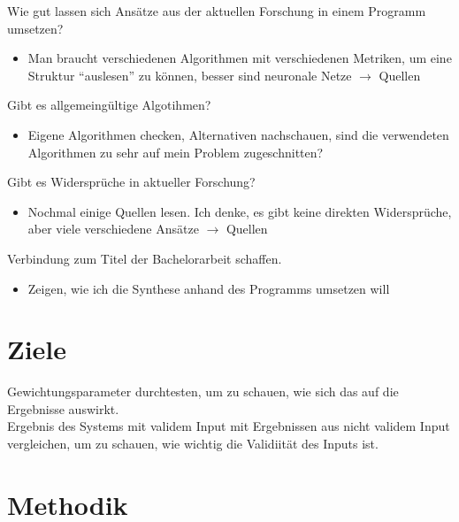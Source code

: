 Wie gut lassen sich Ansätze aus der aktuellen Forschung in einem Programm umsetzen?
\begin{itemize}
    \item Man braucht verschiedenen Algorithmen mit verschiedenen Metriken, um eine Struktur "`auslesen"' zu können, besser sind
    neuronale Netze $\rightarrow$ Quellen
\end{itemize}

Gibt es allgemeingültige Algotihmen?

\begin{itemize}
    \item Eigene Algorithmen checken, Alternativen nachschauen, sind die verwendeten Algorithmen zu sehr auf mein Problem
    zugeschnitten?
\end{itemize}

Gibt es Widersprüche in aktueller Forschung?

\begin{itemize}
    \item Nochmal einige Quellen lesen. Ich denke, es gibt keine direkten Widersprüche, aber viele verschiedene Ansätze
    $\rightarrow$ Quellen
\end{itemize}

Verbindung zum Titel der Bachelorarbeit schaffen.

\begin{itemize}
    \item Zeigen, wie ich die Synthese anhand des Programms umsetzen will
\end{itemize}

\section{Ziele}
Gewichtungsparameter durchtesten, um zu schauen, wie sich das auf die Ergebnisse auswirkt.\\
Ergebnis des Systems mit validem Input mit Ergebnissen aus nicht validem Input vergleichen, um zu schauen, wie wichtig
die Validiität des Inputs ist.\\

\section{Methodik}

